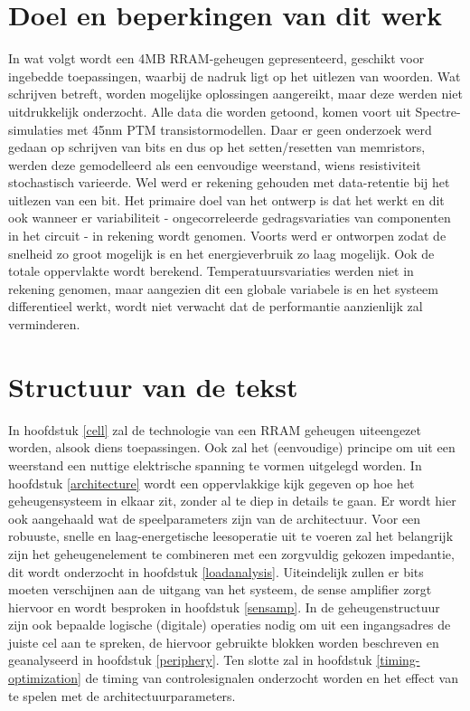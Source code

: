 \section{Doel en beperkingen van dit werk}
In wat volgt wordt een 4MB RRAM-geheugen gepresenteerd, geschikt voor ingebedde toepassingen, waarbij de nadruk ligt op het uitlezen van woorden. Wat schrijven betreft, worden mogelijke oplossingen aangereikt, maar deze werden niet uitdrukkelijk onderzocht.
Alle data die worden getoond, komen voort uit Spectre-simulaties met 45nm PTM transistormodellen. Daar er geen onderzoek werd gedaan op schrijven van bits en dus op het setten/resetten van memristors, werden deze gemodelleerd als een eenvoudige weerstand, wiens resistiviteit stochastisch varieerde. Wel werd er rekening gehouden met data-retentie bij het uitlezen van een bit.
Het primaire doel van het ontwerp is dat het werkt en dit ook wanneer er variabiliteit - ongecorreleerde gedragsvariaties van componenten in het circuit - in rekening wordt genomen.
Voorts werd er ontworpen zodat de snelheid zo groot mogelijk is en het energieverbruik zo laag mogelijk. Ook de totale oppervlakte wordt berekend.
Temperatuursvariaties werden niet in rekening genomen, maar aangezien dit een globale variabele is en het systeem differentieel werkt, wordt niet verwacht dat de performantie aanzienlijk zal verminderen.

\section{Structuur van de tekst}
In hoofdstuk \ref{cell} zal de technologie van een RRAM geheugen uiteengezet worden, alsook diens toepassingen. Ook zal het (eenvoudige) principe om uit een weerstand een nuttige elektrische spanning te vormen uitgelegd worden. In hoofdstuk \ref{architecture} wordt een oppervlakkige kijk gegeven op hoe het geheugensysteem in elkaar zit, zonder al te diep in details te gaan. Er wordt hier ook aangehaald wat de speelparameters zijn van de architectuur. Voor een robuuste, snelle en laag-energetische leesoperatie uit te voeren zal het belangrijk zijn het geheugenelement te combineren met een zorgvuldig gekozen impedantie, dit wordt onderzocht in hoofdstuk \ref{loadanalysis}. Uiteindelijk zullen er bits moeten verschijnen aan de uitgang van het systeem, de sense amplifier zorgt hiervoor en wordt besproken in hoofdstuk \ref{sensamp}.
In de geheugenstructuur zijn ook bepaalde logische (digitale) operaties nodig om uit een ingangsadres de juiste cel aan te spreken, de hiervoor gebruikte blokken worden beschreven en geanalyseerd in hoofdstuk \ref{periphery}.
Ten slotte zal in hoofdstuk \ref{timing-optimization} de timing van controlesignalen onderzocht worden en het effect van te spelen met de architectuurparameters.